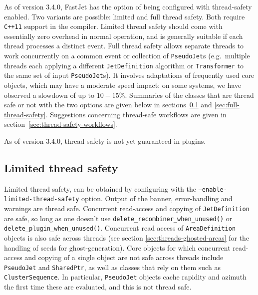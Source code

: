 \documentclass[12pt,a4]{article}
\newcommand{\ttt}[1]{{\small\texttt{#1}}}
\begin{document}
As of version 3.4.0, FastJet has the option of being configured with
thread-safety enabled.
%
Two variants are possible: limited and full thread safety.
%
Both require \ttt{C++11} support in the compiler.
%
Limited thread safety should come with essentially zero overhead in
normal operation, and is generally suitable if each thread processes a
distinct event.
%
Full thread safety allows separate threads to work concurrently on a
common event or collection of \ttt{PseudoJet}s (e.g.\ multiple threads
each applying a different \ttt{JetDefinition} algorithm or
\ttt{Transformer} to the same set of input \ttt{PseudoJet}s).
%
It involves adaptations of frequently used core objects, which may
have a moderate speed impact: on some systems, we have observed a
slowdown of up to $10{-}15\%$.
%
Summaries of the classes that are thread safe or not with the two
options are given below in
sections~\ref{sec:limit-thre-safety} and \ref{sec:full-thread-safety}.
%
Suggestions concerning thread-safe workflows are given in
section~\ref{sec:thread-safety-workflows}. 

As of version 3.4.0, thread safety is not yet guaranteed in plugins.


\subsection{Limited thread safety}
\label{sec:limit-thre-safety}

Limited thread safety, can be obtained by configuring with the
\ttt{--enable-limited-thread-safety} option.
%
Output of the banner, error-handling and warnings are thread
safe.
%
Concurrent read-access and copying of \ttt{JetDefinition} are safe, so
long as one doesn't use \ttt{delete\_recombiner\_when\_unused()} or
\ttt{delete\_plugin\_when\_unused()}.
%
Concurrent read access of \ttt{AreaDefinition} objects is also safe
across threads (see section \ref{sec:threads-ghosted-areas} for the
handling of seeds for ghost-generation).
%
Core objects for which concurrent read-access and copying of a single
object are not safe across threads include \ttt{PseudoJet} and
\ttt{SharedPtr}, as well as classes that rely on them such as
\ttt{ClusterSequence}.
%
In particular, \ttt{PseudoJet} objects cache rapidity and azimuth the
first time these are evaluated, and this is not thread safe.


\end{document}
